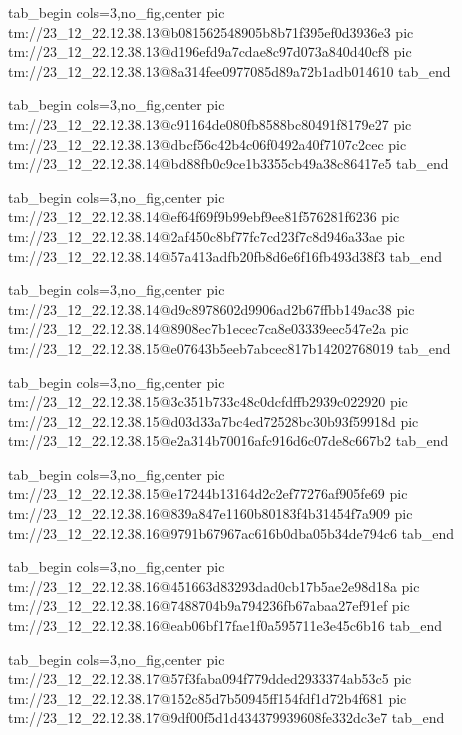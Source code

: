  
 
 
 
 

\qqSecCmtScr


\ifcmt
  tab_begin cols=3,no_fig,center
    pic tm://23_12_22.12.38.13@b081562548905b8b71f395ef0d3936e3
    pic tm://23_12_22.12.38.13@d196efd9a7cdae8c97d073a840d40cf8
    pic tm://23_12_22.12.38.13@8a314fee0977085d89a72b1adb014610
  tab_end
\fi


\ifcmt
  tab_begin cols=3,no_fig,center
    pic tm://23_12_22.12.38.13@c91164de080fb8588bc80491f8179e27
    pic tm://23_12_22.12.38.13@dbcf56c42b4c06f0492a40f7107c2cec
    pic tm://23_12_22.12.38.14@bd88fb0c9ce1b3355cb49a38c86417e5
  tab_end
\fi


\ifcmt
  tab_begin cols=3,no_fig,center
    pic tm://23_12_22.12.38.14@ef64f69f9b99ebf9ee81f576281f6236
    pic tm://23_12_22.12.38.14@2af450c8bf77fc7cd23f7c8d946a33ae
    pic tm://23_12_22.12.38.14@57a413adfb20fb8d6e6f16fb493d38f3
  tab_end
\fi


\ifcmt
  tab_begin cols=3,no_fig,center
    pic tm://23_12_22.12.38.14@d9c8978602d9906ad2b67ffbb149ac38
    pic tm://23_12_22.12.38.14@8908ec7b1ecec7ca8e03339eec547e2a
    pic tm://23_12_22.12.38.15@e07643b5eeb7abcec817b14202768019
  tab_end
\fi


\ifcmt
  tab_begin cols=3,no_fig,center
    pic tm://23_12_22.12.38.15@3c351b733c48c0dcfdffb2939c022920
    pic tm://23_12_22.12.38.15@d03d33a7bc4ed72528bc30b93f59918d
    pic tm://23_12_22.12.38.15@e2a314b70016afc916d6c07de8c667b2
  tab_end
\fi


\ifcmt
  tab_begin cols=3,no_fig,center
    pic tm://23_12_22.12.38.15@e17244b13164d2c2ef77276af905fe69
    pic tm://23_12_22.12.38.16@839a847e1160b80183f4b31454f7a909
    pic tm://23_12_22.12.38.16@9791b67967ac616b0dba05b34de794c6
  tab_end
\fi


\ifcmt
  tab_begin cols=3,no_fig,center
    pic tm://23_12_22.12.38.16@451663d83293dad0cb17b5ae2e98d18a
    pic tm://23_12_22.12.38.16@7488704b9a794236fb67abaa27ef91ef
    pic tm://23_12_22.12.38.16@eab06bf17fae1f0a595711e3e45c6b16
  tab_end
\fi


\ifcmt
  tab_begin cols=3,no_fig,center
    pic tm://23_12_22.12.38.17@57f3faba094f779dded2933374ab53c5
    pic tm://23_12_22.12.38.17@152c85d7b50945ff154fdf1d72b4f681
    pic tm://23_12_22.12.38.17@9df00f5d1d434379939608fe332dc3e7
  tab_end
\fi


